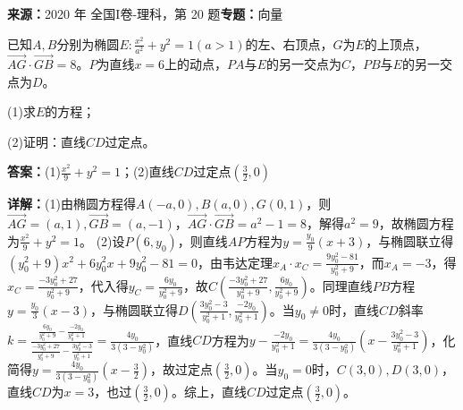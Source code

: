 \begin{question}[points=12]
\textbf{来源：}2020 年 全国I卷-理科，第 20 题\quad \textbf{专题：}向量\par
已知$A,B$分别为椭圆$E:\frac{x^2}{a^2}+y^2=1(a>1)$的左、右顶点，$G$为$E$的上顶点，$\overrightarrow{AG}\cdot\overrightarrow{GB}=8$。$P$为直线$x=6$上的动点，$PA$与$E$的另一交点为$C$，$PB$与$E$的另一交点为$D$。

(1)求$E$的方程；

(2)证明：直线$CD$过定点。
\begin{solution}
\textbf{答案：}(1)$\frac{x^2}{9}+y^2=1$；(2)直线$CD$过定点$\left(\frac{3}{2},0\right)$

\textbf{详解：}(1)由椭圆方程得$A(-a,0),B(a,0),G(0,1)$，则$\overrightarrow{AG}=(a,1),\overrightarrow{GB}=(a,-1)$，$\overrightarrow{AG}\cdot\overrightarrow{GB}=a^2-1=8$，解得$a^2=9$，故椭圆方程为$\frac{x^2}{9}+y^2=1$。
(2)设$P(6,y_0)$，则直线$AP$方程为$y=\frac{y_0}{9}(x+3)$，与椭圆联立得$(y_0^2+9)x^2+6y_0^2x+9y_0^2-81=0$，由韦达定理$x_A\cdot x_C=\frac{9y_0^2-81}{y_0^2+9}$，而$x_A=-3$，得$x_C=\frac{-3y_0^2+27}{y_0^2+9}$，代入得$y_C=\frac{6y_0}{y_0^2+9}$，故$C\left(\frac{-3y_0^2+27}{y_0^2+9},\frac{6y_0}{y_0^2+9}\right)$。同理直线$PB$方程$y=\frac{y_0}{3}(x-3)$，与椭圆联立得$D\left(\frac{3y_0^2-3}{y_0^2+1},\frac{-2y_0}{y_0^2+1}\right)$。当$y_0\neq0$时，直线$CD$斜率$k=\frac{\frac{6y_0}{y_0^2+9}-\frac{-2y_0}{y_0^2+1}}{\frac{-3y_0^2+27}{y_0^2+9}-\frac{3y_0^2-3}{y_0^2+1}}=\frac{4y_0}{3(3-y_0^2)}$，直线$CD$方程为$y-\frac{-2y_0}{y_0^2+1}=\frac{4y_0}{3(3-y_0^2)}\left(x-\frac{3y_0^2-3}{y_0^2+1}\right)$，化简得$y=\frac{4y_0}{3(3-y_0^2)}\left(x-\frac{3}{2}\right)$，故过定点$\left(\frac{3}{2},0\right)$。当$y_0=0$时，$C(3,0),D(3,0)$，直线$CD$为$x=3$，也过$\left(\frac{3}{2},0\right)$。综上，直线$CD$过定点$\left(\frac{3}{2},0\right)$。
\end{solution}
\end{question}

